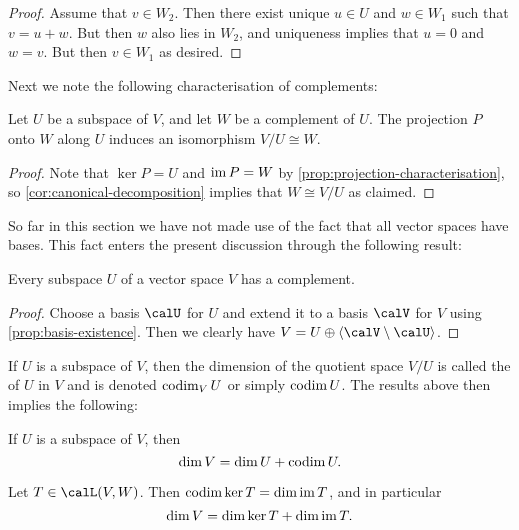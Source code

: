 \begin{proof}
    Assume that $v \in W_2$. Then there exist unique $u \in U$ and $w \in W_1$ such that $v = u + w$. But then $w$ also lies in $W_2$, and uniqueness implies that $u = 0$ and $w = v$. But then $v \in W_1$ as desired.
\end{proof}
%
Next we note the following characterisation of complements:

\begin{proposition}
    \label{prop:complement-iso-to-quotient}
    Let $U$ be a subspace of $V$, and let $W$ be a complement of $U$. The projection $P$ onto $W$ along $U$ induces an isomorphism $V/U \cong W$.
\end{proposition}

\begin{proof}
    Note that $\ker P = U$ and $\operatorname{im} P = W$ by \cref{prop:projection-characterisation}, so \cref{cor:canonical-decomposition} implies that $W \cong V/U$ as claimed. %
\end{proof}


So far in this section we have not made use of the fact that all vector spaces have bases. This fact enters the present discussion through the following result:

\begin{proposition}
    Every subspace $U$ of a vector space $V$ has a complement.
\end{proposition}

\begin{proof}
    Choose a basis $\calU$ for $U$ and extend it to a basis $\calV$ for $V$ using \cref{prop:basis-existence}. Then we clearly have $V = U \dirsum \gen{\calV \setminus \calU}$.
\end{proof}

If $U$ is a subspace of $V$, then the dimension of the quotient space $V/U$ is called the  of $U$ in $V$ and is denoted $\operatorname{codim}_V U$ or simply $\operatorname{codim} U$. The results above then implies the following:

\begin{corollarynoproof}
    If $U$ is a subspace of $V$, then
    \begin{equation*}
        \dim V
            = \dim U + \operatorname{codim} U.
    \end{equation*}
\end{corollarynoproof}


\begin{corollarynoproof}
    \label{cor:rank-nullity}
    Let $T \in \lin(V,W)$. Then $\operatorname{codim} \ker T = \dim \operatorname{im} T$, and in particular
    \begin{equation*}
        \dim V
            = \dim \ker T + \dim \operatorname{im} T.
    \end{equation*}
\end{corollarynoproof}

